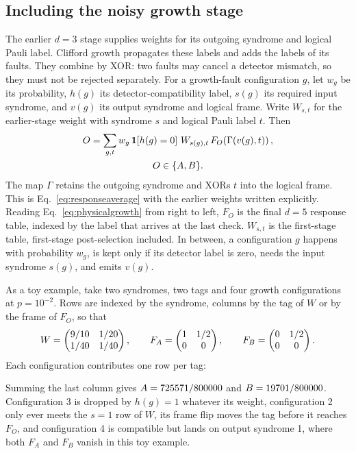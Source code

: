 \subsection{Including the noisy growth stage}\label{app:growth-overview-v2}
The earlier $d=3$ stage supplies weights for its outgoing syndrome and logical Pauli label. Clifford growth propagates these labels and adds the labels of its faults. They combine by XOR: two faults may cancel a detector mismatch, so they must not be rejected separately. For a growth-fault configuration $g$, let $w_g$ be its probability, $h(g)$ its detector-compatibility label, $s(g)$ its required input syndrome, and $v(g)$ its output syndrome and logical frame. Write $W_{s,t}$ for the earlier-stage weight with syndrome $s$ and logical Pauli label $t$. Then
\begin{equation}
 \begin{gathered}
 O=\sum_{g,t}w_g\,\mathbf1\!\left[h(g)=0\right]\,
       W_{s(g),t}\,F_O\!\left(\Gamma(v(g),t)\right),\\
 O\in\{A,B\}.
 \end{gathered}
 \label{eq:physicalgrowth}
\end{equation}
The map $\Gamma$ retains the outgoing syndrome and XORs $t$ into the logical frame. This is Eq.~\eqref{eq:responseaverage} with the earlier weights written explicitly. 
Reading Eq.~\eqref{eq:physicalgrowth} from right to left, $F_O$ is the final $d=5$ response table, indexed by the label that arrives at the last check. $W_{s,t}$ is the first-stage table, first-stage post-selection included. 
In between, a configuration $g$ happens with probability $w_g$, is kept only if its detector label is zero, needs the input syndrome $s(g)$, and emits $v(g)$. 

As a toy example, take two syndromes, two tags and four growth configurations at $p=10^{-2}$. Rows are indexed by the syndrome, columns by the tag of $W$ or by the frame of $F_O$, so that
\[
W=\begin{pmatrix}9/10&1/20\\1/40&1/40\end{pmatrix},\qquad F_A=\begin{pmatrix}1&1/2\\0&0\end{pmatrix},\qquad F_B=\begin{pmatrix}0&1/2\\0&0\end{pmatrix} .
\]
Each configuration contributes one row per tag:
{\color{black}
\begin{center}\small\end{center}}
Summing the last column gives $A=725571/800000$ and $B=19701/800000$. Configuration 3 is dropped by $h(g)=1$ whatever its weight, configuration 2 only ever meets the $s=1$ row of $W$, its frame flip moves the tag before it reaches $F_O$, and configuration 4 is compatible but lands on output syndrome 1, where both $F_A$ and $F_B$ vanish in this toy example. 

